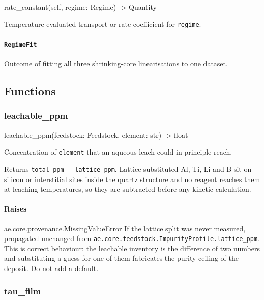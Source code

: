 \documentclass[10pt,a4paper,twoside]{report}
\begin{document}
\begin{verbatimsmall}
rate_constant(self, regime: Regime) -> Quantity
\end{verbatimsmall}

Temperature-evaluated transport or rate coefficient for \texttt{regime}.

\paragraph{\texttt{RegimeFit}}

Outcome of fitting all three shrinking-core linearisations to one dataset.

\subsection*{Functions}

\subsubsection*{leachable\_ppm}

\begin{verbatimsmall}
leachable_ppm(feedstock: Feedstock, element: str) -> float
\end{verbatimsmall}

Concentration of \texttt{element} that an aqueous leach could in principle reach.

Returns \texttt{total\_ppm - lattice\_ppm}. Lattice-substituted Al, Ti, Li and B sit on silicon or interstitial sites inside the quartz structure and no reagent reaches them at leaching temperatures, so they are subtracted before any kinetic calculation.

\paragraph*{Raises}

ae.core.provenance.MissingValueError If the lattice split was never measured, propagated unchanged from \texttt{ae.core.feedstock.ImpurityProfile.lattice\_ppm}. This is correct behaviour: the leachable inventory is the difference of two numbers and substituting a guess for one of them fabricates the purity ceiling of the deposit. Do not add a default.

\subsubsection*{tau\_film}
\end{document}
